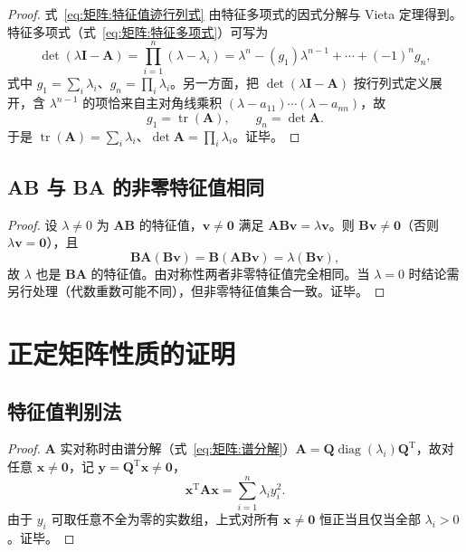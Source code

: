 \begin{proof}
式~\eqref{eq:矩阵:特征值迹行列式} 由特征多项式的因式分解与 Vieta 定理得到。特征多项式（式~\eqref{eq:矩阵:特征多项式}）可写为
\[
\det(\lambda\boldsymbol{I}-\boldsymbol{A}) = \prod_{i=1}^{n}(\lambda-\lambda_i) = \lambda^{n}-(g_1)\lambda^{n-1}+\cdots+(-1)^{n}g_n,
\]
式中 $g_1 = \sum_{i}\lambda_i$、$g_n = \prod_{i}\lambda_i$。另一方面，把 $\det(\lambda\boldsymbol{I}-\boldsymbol{A})$ 按行列式定义展开，含 $\lambda^{n-1}$ 的项恰来自主对角线乘积 $(\lambda-a_{11})\cdots(\lambda-a_{nn})$，故
\[
g_1 = \operatorname{tr}(\boldsymbol{A}),\qquad g_n = \det\boldsymbol{A}.
\]
于是 $\operatorname{tr}(\boldsymbol{A}) = \sum_{i}\lambda_i$、$\det\boldsymbol{A} = \prod_{i}\lambda_i$。证毕。
\end{proof}

\subsection*{AB 与 BA 的非零特征值相同}

\begin{proof}
设 $\lambda\neq 0$ 为 $\boldsymbol{A}\boldsymbol{B}$ 的特征值，$\boldsymbol{v}\neq\boldsymbol{0}$ 满足 $\boldsymbol{A}\boldsymbol{B}\boldsymbol{v} = \lambda\boldsymbol{v}$。则 $\boldsymbol{B}\boldsymbol{v}\neq\boldsymbol{0}$（否则 $\lambda\boldsymbol{v} = \boldsymbol{0}$），且
\[
\boldsymbol{B}\boldsymbol{A}(\boldsymbol{B}\boldsymbol{v}) = \boldsymbol{B}(\boldsymbol{A}\boldsymbol{B}\boldsymbol{v}) = \lambda(\boldsymbol{B}\boldsymbol{v}),
\]
故 $\lambda$ 也是 $\boldsymbol{B}\boldsymbol{A}$ 的特征值。由对称性两者非零特征值完全相同。当 $\lambda = 0$ 时结论需另行处理（代数重数可能不同），但非零特征值集合一致。证毕。
\end{proof}

\section{正定矩阵性质的证明}
\label{sec:正定证明}

\subsection*{特征值判别法}

\begin{proof}
$\boldsymbol{A}$ 实对称时由谱分解（式~\eqref{eq:矩阵:谱分解}）$\boldsymbol{A} = \boldsymbol{Q}\operatorname{diag}(\lambda_i)\boldsymbol{Q}^{\mathrm{T}}$，故对任意 $\boldsymbol{x}\neq\boldsymbol{0}$，记 $\boldsymbol{y} = \boldsymbol{Q}^{\mathrm{T}}\boldsymbol{x}\neq\boldsymbol{0}$，
\[
\boldsymbol{x}^{\mathrm{T}}\boldsymbol{A}\boldsymbol{x} = \sum_{i=1}^{n}\lambda_i y_i^{2}.
\]
由于 $y_i$ 可取任意不全为零的实数组，上式对所有 $\boldsymbol{x}\neq\boldsymbol{0}$ 恒正当且仅当全部 $\lambda_i > 0$。证毕。
\end{proof}

